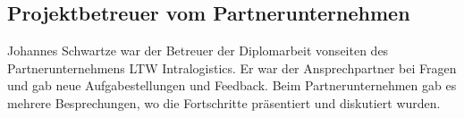 \subsection{Projektbetreuer vom Partnerunternehmen}
Johannes Schwartze war der Betreuer der Diplomarbeit vonseiten des Partnerunternehmens LTW Intralogistics. Er war der Ansprechpartner bei Fragen und gab neue Aufgabestellungen und Feedback. Beim Partnerunternehmen gab es mehrere Besprechungen, wo die Fortschritte präsentiert und diskutiert wurden.  \\